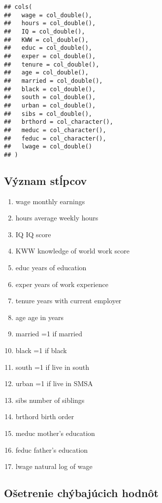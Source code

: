 \documentclass[
]{article}
\providecommand{\tightlist}{%
  \setlength{\itemsep}{0pt}\setlength{\parskip}{0pt}}
\begin{document}
\begin{verbatim}
## cols(
##   wage = col_double(),
##   hours = col_double(),
##   IQ = col_double(),
##   KWW = col_double(),
##   educ = col_double(),
##   exper = col_double(),
##   tenure = col_double(),
##   age = col_double(),
##   married = col_double(),
##   black = col_double(),
##   south = col_double(),
##   urban = col_double(),
##   sibs = col_double(),
##   brthord = col_character(),
##   meduc = col_character(),
##   feduc = col_character(),
##   lwage = col_double()
## )
\end{verbatim}

\hypertarget{vuxfdznam-stux13apcov}{%
\subsection{Význam stĺpcov}\label{vuxfdznam-stux13apcov}}

\begin{enumerate}
\def\labelenumi{\arabic{enumi}.}
\tightlist
\item
  wage monthly earnings
\item
  hours average weekly hours
\item
  IQ IQ score
\item
  KWW knowledge of world work score
\item
  educ years of education
\item
  exper years of work experience
\item
  tenure years with current employer
\item
  age age in years
\item
  married =1 if married
\item
  black =1 if black
\item
  south =1 if live in south
\item
  urban =1 if live in SMSA
\item
  sibs number of siblings
\item
  brthord birth order
\item
  meduc mother's education
\item
  feduc father's education
\item
  lwage natural log of wage
\end{enumerate}

\hypertarget{oux161etrenie-chuxfdbajuxfacich-hodnuxf4t}{%
\subsection{Ošetrenie chýbajúcich
hodnôt}\label{oux161etrenie-chuxfdbajuxfacich-hodnuxf4t}}
\end{document}
